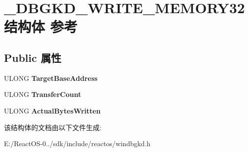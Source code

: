 \hypertarget{struct___d_b_g_k_d___w_r_i_t_e___m_e_m_o_r_y32}{}\section{\+\_\+\+D\+B\+G\+K\+D\+\_\+\+W\+R\+I\+T\+E\+\_\+\+M\+E\+M\+O\+R\+Y32结构体 参考}
\label{struct___d_b_g_k_d___w_r_i_t_e___m_e_m_o_r_y32}
\subsection*{Public 属性}
\begin{DoxyCompactItemize}
\item 
\mbox{\label{struct___d_b_g_k_d___w_r_i_t_e___m_e_m_o_r_y32_a048ea94bc07330fa2b224fc6415515a1}} 
U\+L\+O\+NG {\bfseries Target\+Base\+Address}
\item 
\mbox{\label{struct___d_b_g_k_d___w_r_i_t_e___m_e_m_o_r_y32_ac723b726906b3e94ef9e11d6381579bd}} 
U\+L\+O\+NG {\bfseries Transfer\+Count}
\item 
\mbox{\label{struct___d_b_g_k_d___w_r_i_t_e___m_e_m_o_r_y32_a3a86295e34952d4945d8b03c1d934745}} 
U\+L\+O\+NG {\bfseries Actual\+Bytes\+Written}
\end{DoxyCompactItemize}


该结构体的文档由以下文件生成\+:\begin{DoxyCompactItemize}
\item 
E\+:/\+React\+O\+S-\/0../sdk/include/reactos/windbgkd.\+h\end{DoxyCompactItemize}
